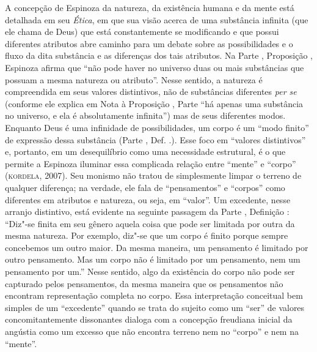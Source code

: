 A concepção de Espinoza da natureza, da existência humana e da mente
está detalhada em seu \emph{Ética}, em que sua visão acerca de uma
substância infinita (que ele chama de Deus) que está constantemente se
modificando e que possui diferentes atributos abre caminho para um
debate sobre as possibilidades e o fluxo da dita substância e as
diferenças dos tais atributos. Na Parte , Proposição , Espinoza afirma
que ``não pode haver no universo duas ou mais substâncias que possuam a
mesma natureza ou atributo''. Nesse sentido, a natureza é compreendida
em seus valores distintivos, não de substâncias diferentes \emph{per se}
(conforme ele explica em Nota à Proposição , Parte  ``há apenas uma
substância no universo, e ela é absolutamente infinita'') mas de seus
diferentes modos. Enquanto Deus é uma infinidade de possibilidades, um
corpo é um ``modo finito'' de expressão dessa substância (Parte , Def.
.). Esse foco em ``valores distintivos'' e, portanto, em um
desequilíbrio como uma necessidade estrutural, é o que permite a
Espinoza iluminar essa complicada relação entre ``mente'' e ``corpo''
(\textsc{kordela}, 2007). Seu monismo não tratou de simplesmente limpar o terreno
de qualquer diferença; na verdade, ele fala de ``pensamentos'' e
``corpos'' como diferentes em atributos e natureza, ou seja, em
``valor''. Um excedente, nesse arranjo distintivo, está evidente na
seguinte passagem da Parte , Definição : ``Diz"-se finita em seu
gênero aquela coisa que pode ser limitada por outra da mesma natureza.
Por exemplo, diz"-se que um corpo é finito porque sempre concebemos um
outro maior. Da mesma maneira, um pensamento é limitado por outro
pensamento. Mas um corpo não é limitado por um pensamento, nem um
pensamento por um.'' Nesse sentido, algo da existência do corpo não pode
ser capturado pelos pensamentos, da mesma maneira que os pensamentos não
encontram representação completa no corpo. Essa interpretação conceitual
bem simples de um ``excedente'' quando se trata do sujeito como um
``ser'' de valores concomitantemente dissonantes dialoga com a concepção
freudiana inicial da angústia como um excesso que não encontra terreno
nem no ``corpo'' e nem na ``mente''.

